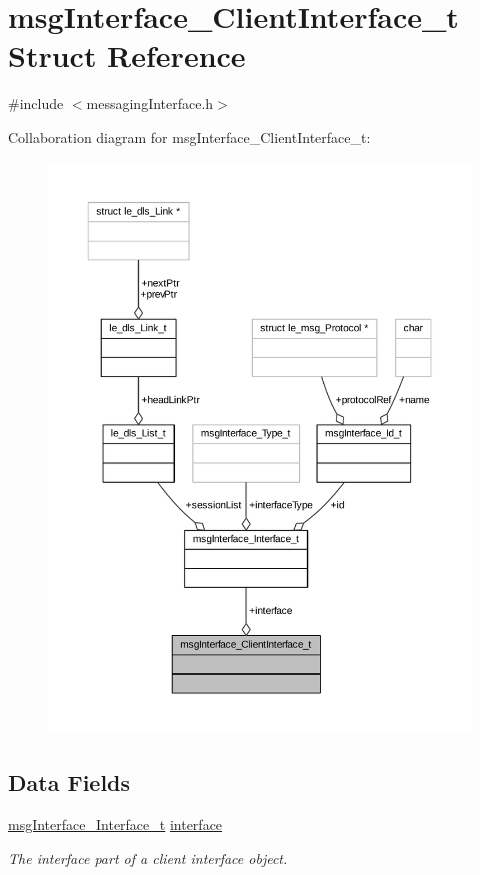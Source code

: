 \hypertarget{structmsg_interface___client_interface__t}{}\section{msg\+Interface\+\_\+\+Client\+Interface\+\_\+t Struct Reference}
\label{structmsg_interface___client_interface__t}


{\ttfamily \#include $<$messaging\+Interface.\+h$>$}



Collaboration diagram for msg\+Interface\+\_\+\+Client\+Interface\+\_\+t\+:
\nopagebreak
\begin{figure}[H]
\begin{center}
\leavevmode
\includegraphics[width=350pt]{structmsg_interface___client_interface__t__coll__graph}
\end{center}
\end{figure}
\subsection*{Data Fields}
\begin{DoxyCompactItemize}
\item 
\hyperlink{structmsg_interface___interface__t}{msg\+Interface\+\_\+\+Interface\+\_\+t} \hyperlink{structmsg_interface___client_interface__t_ae47c1c05e49def8707ca81f26aba5e48}{interface}
\begin{DoxyCompactList}\small\item\em The interface part of a client interface object. \end{DoxyCompactList}\end{DoxyCompactItemize}


